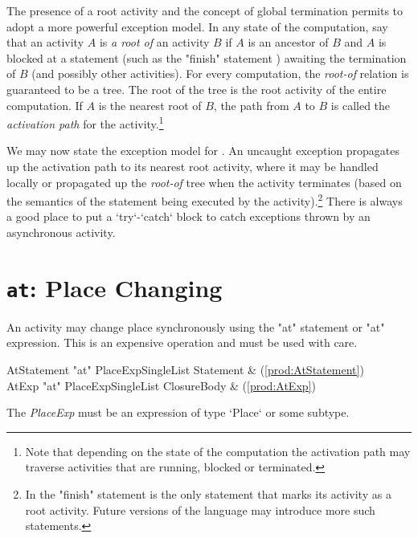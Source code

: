 The presence of a root activity and the concept of global termination permits
\Xten{} to adopt a more powerful exception model. In any state of the
computation, say that an activity $A$ is {\em a root of} an activity $B$ if
$A$ is an ancestor of $B$ and $A$ is blocked at a statement (such as the
\xcd"finish" statement ) awaiting the termination of $B$ (and
possibly other activities). For every \Xten{} computation, the \emph{root-of}
relation is guaranteed to be a tree. The root of the tree is the root activity
of the entire computation. If $A$ is the nearest root of $B$, the path from
$A$ to $B$ is called the {\em activation path} for the activity.\footnote{Note
  that depending on the state of the computation the activation path may
  traverse activities that are running, blocked or terminated.}

We may now state the exception model for \Xten.  An uncaught exception
propagates up the activation path to its nearest root activity, where
it may be handled locally or propagated up the \emph{root-of} tree when
the activity terminates (based on the semantics of the statement being
executed by the activity).\footnote{In \XtenCurrVer{} the \xcd"finish"
statement is the only statement that marks its activity as a root
activity. Future versions of the language may introduce more such
statements.}  
There is always a good place to put a \xcd`try`-\xcd`catch` block to catch
exceptions thrown by an asynchronous activity.

\section{ {\tt at}: Place Changing}\label{AtStatement}

An activity may change place synchronously using the \xcd"at" statement or
\xcd"at" expression. This is an expensive operation and must be used
with care.

\begin{bbgrammar}
         AtStatement \: \xcd"at" PlaceExpSingleList Statement & (\ref{prod:AtStatement}) \\
               AtExp \: \xcd"at" PlaceExpSingleList ClosureBody & (\ref{prod:AtExp}) \\
\end{bbgrammar}

The {\it PlaceExp} must be an expression of type \xcd`Place` or some subtype.

